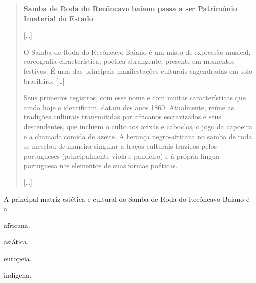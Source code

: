 \begin{quote}
\textbf{Samba de Roda do Recôncavo baiano passa a ser Patrimônio Imaterial do Estado}

{[}\ldots{}{]}

O Samba de Roda do Recôncavo Baiano é um misto de expressão musical,
coreografia característica, poética abrangente, presente em momentos
festivos. É uma das principais manifestações culturais engendradas em
solo brasileiro. {[}\ldots{}{]}

Seus primeiros registros, com esse nome e com muitas características que
ainda hoje o identificam, datam dos anos 1860. Atualmente, reúne as
tradições culturais transmitidas por africanos escravizados e seus
descendentes, que incluem o culto aos orixás e caboclos, o jogo da
capoeira e a chamada comida de azeite. A herança negro-africana no samba
de roda se mesclou de maneira singular a traços culturais trazidos pelos
portugueses (principalmente viola e pandeiro) e à própria língua
portuguesa nos elementos de suas formas poéticas.

{[}\ldots{}{]}

\end{quote}

A principal matriz estética e cultural do Samba de Roda do Recôncavo Baiano é a

\begin{minipage}{.5\textwidth}
\begin{escolha}
\item
  africana.
\item
  asiática.
\item
  europeia.
\item
  indígena.
\end{escolha}
\end{minipage}



